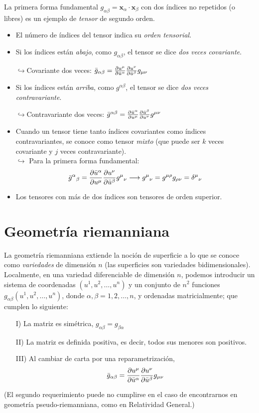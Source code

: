 La primera forma fundamental $g_{\alpha \beta} =\mathbf{x}_\alpha \cdot \mathbf{x}_\beta $ con dos índices no repetidos (o libres) es un ejemplo de \emph{tensor} de segundo orden.
\begin{itemize}
    \item El número de índices del tensor indica su \emph{orden tensorial}.
    \item Si los índices están \emph{abajo}, como $g_{\alpha \beta}$, el tensor se dice \emph{dos veces covariante}.
    
    $\hookrightarrow$Covariante dos veces: $ \Bar{g}_{\alpha \beta} = \pdv{u^\mu }{\Bar{u}^\alpha }\pdv{u^\nu }{\Bar{u}^\beta }g_{\mu \nu}$ 
    \item Si los índices están \emph{arriba}, como $g^{\alpha \beta} $, el tensor se dice \emph{dos veces contravariante}.
    
    $\hookrightarrow $Contravariante dos veces: $\Bar{g}^{\alpha \beta}=\pdv{\Bar{u}^\alpha }{u^\mu }\pdv{\Bar{u}^\beta }{u^\nu }g^{\mu \nu}$

    \item Cuando un tensor tiene tanto índices covariantes como índices contravariantes, se conoce como tensor \emph{mixto} (que puede ser $k$ veces covariante y $j$ veces contravariante).\\

    $\hookrightarrow$ Para la primera forma fundamental:
    $$
    \Bar{g}^\alpha{} _\beta=\pdv{\Bar{u}^\alpha }{u^\mu} \pdv{u^\nu }{\Bar{u}^\beta }g^\mu {}_\nu \longrightarrow g^\mu{} _\nu =g^{\mu \rho }g_{\rho \nu }=\delta ^\mu{}_\nu 
    $$

    \item Los tensores con más de dos índices son tensores de orden superior.
\end{itemize}
\section{Geometría riemanniana}
La geometría riemanniana extiende la noción de superficie a lo que se conoce como \emph{variedades} de dimensión $n$ (las superficies son variedades bidimensionales). Localmente, en una variedad diferenciable de dimensión $n$, podemos introducir un sistema de coordenadas $(u^1,u^2,\ldots , u^n)$ y un conjunto de $n^2$ funciones $g_{\alpha \beta} (u^1,u^2,\ldots, u^n)$, donde $\alpha ,\beta=1,2,\ldots , n$, y ordenadas matricialmente; que cumplen lo siguiente:
\begin{enumerate}
    \item[I)] La matriz es simétrica, $g_{\alpha \beta}=g_{\beta \alpha}$
    \item[II)] La matriz es definida positiva, es decir, todos sus menores son positivos.
    \item[III)] Al cambiar de carta por una reparametrización,
    $$
    \Bar{g}_{\alpha \beta}=\pdv{u^\mu }{\Bar{u}^\alpha }\pdv{u^\nu }{\Bar{u}^\beta }g_{\mu \nu}
    $$
\end{enumerate}
(El segundo requerimiento puede no cumplirse en el caso de encontrarnos en geometría pseudo-riemanniana, como en Relatividad General.)\\


